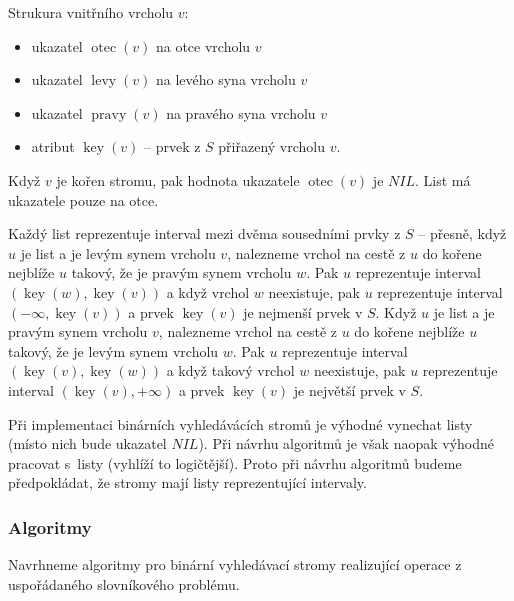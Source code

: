 \documentclass[a4paper,12pt]{article}
\newenvironment{pitemize}{
 \begin{itemize}
   \setlength{\itemsep}{1pt}
   \setlength{\parskip}{0pt}
   \setlength{\parsep}{0pt}
 }{\end{itemize}}
\DeclareMathOperator*{\otec}{otec}
\DeclareMathOperator*{\levy}{levy}
\DeclareMathOperator*{\pravy}{pravy}
\DeclareMathOperator*{\key}{key}
\begin{document}
Strukura vnitřního vrcholu $v$:
\begin{pitemize}
\item ukazatel $\otec(v)$ na otce vrcholu $v$
\item ukazatel $\levy(v)$ na levého syna vrcholu $v$
\item ukazatel $\pravy(v)$ na pravého syna vrcholu $v$ 
\item atribut $\key(v)$ -- prvek z $S$ přiřazený vrcholu $v$.
\end{pitemize}
Když $v$ je kořen stromu, pak hodnota ukazatele $\otec(v)$ 
je $NIL$. List má ukazatele pouze na otce.

Každý list reprezentuje interval mezi dvěma 
sousedními prvky z $S$ -- přesně, když $u$ je list a je 
levým synem vrcholu $v$, nalezneme vrchol na cestě z $u$ 
do kořene nejblíže $u$ takový, že je pravým synem 
vrcholu $w$. Pak $u$ repre\-zentuje interval $(\key(w),\key(v))$ a 
když vrchol $w$ neexistuje, pak $u$ repre\-zentuje 
interval $(-\infty ,\key(v))$ a prvek $\key(v)$ je nej\-menší prvek v 
$S$.  Když $u$ je list a je pravým synem vrcholu $v$, 
nalezneme vrchol na cestě z $u$ do kořene nejblíže 
$u$ takový, že je levým synem vrcholu $w$. Pak $u$ repre\-zentuje 
interval $(\key(v),\key(w))$ a když takový vrchol $w$ neexistuje, 
pak $u$ repre\-zentuje interval $(\key(v),+\infty )$ a prvek $\key
(v)$ 
je největší prvek v $S$.  

Při implementaci binárních vyhledávácích 
stromů je výhodné vynechat listy (místo nich bude 
ukazatel $NIL$). Při návrhu algoritmů je však 
naopak výhodné 
pracovat s~listy (vyhlíží to logičtější). Proto při návrhu 
algoritmů budeme předpokládat, že stromy mají 
listy reprezentující intervaly.

\subsubsection{Algoritmy}
Navrhneme algoritmy pro binární vyhledávací stromy 
rea\-lizují\-cí operace z uspořádaného slovníkového problému.
\end{document}
